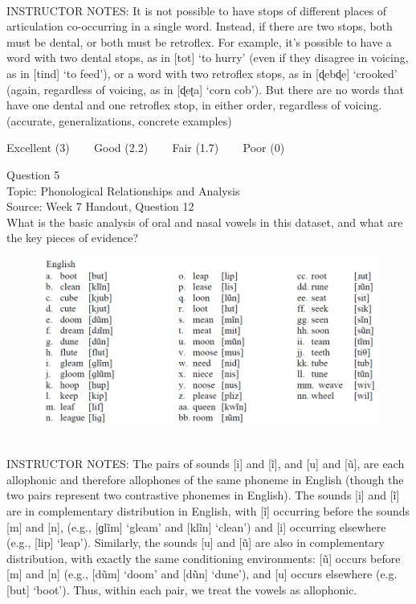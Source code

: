 \documentclass[12pt]{article}
\begin{document}
~\\
INSTRUCTOR NOTES: It is not possible to have stops of different places of articulation co-occurring in a single word. Instead, if there are two stops, both must be dental, or both must be retroflex. For example, it’s possible to have a word with two dental stops, as in [tot] ‘to hurry’ (even if they disagree in voicing, as in [tind] ‘to feed’), or a word with two retroflex stops, as in [ɖebɖe] ‘crooked’ (again, regardless of voicing, as in [ɖeʈa] ‘corn cob’). But there are no words that have one dental and one retroflex stop, in either order, regardless of voicing. (accurate, generalizations, concrete examples)


\vfill
Excellent (3) ~~~ Good (2.2) ~~~ Fair (1.7) ~~~ Poor (0)
\newpage

{\large Question 5}\\

Topic: Phonological Relationships and Analysis\\
Source: Week 7 Handout, Question 12\\

What is the basic analysis of oral and nasal vowels in this dataset, and what are the key pieces of evidence?\\

\begin{figure}[H]
\includegraphics{../images/english12.png}
\end{figure}

~\\
INSTRUCTOR NOTES: The pairs of sounds [i] and [ĩ], and [u] and [ũ], are each allophonic and therefore allophones of the same phoneme in English (though the two pairs represent two contrastive phonemes in English). The sounds [i] and [ĩ] are in complementary distribution in English, with [ĩ] occurring before the sounds [m] and [n], (e.g., [ɡlĩm] ‘gleam’ and [klĩn] ‘clean’) and [i] occurring elsewhere (e.g., [lip] ‘leap’). Similarly, the sounds [u] and [ũ] are also in complementary distribution, with exactly the same conditioning environments: [ũ] occurs before [m] and [n] (e.g., [dũm] ‘doom’ and [dũn] ‘dune’), and [u] occurs elsewhere (e.g. [but] ‘boot’). Thus, within each pair, we treat the vowels as allophonic. 
\end{document}
